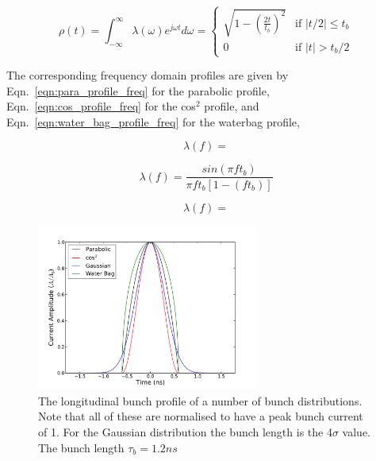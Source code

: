 \begin{equation}
\rho\left( t \right) = \int^{\infty}_{-\infty} \lambda \left( \omega \right) e^{j\omega t} d\omega = 
\begin{cases}
\sqrt{1-\left( \frac{2t}{t_{b}}\right)^{2}} &\textrm{if $| t/2 | \leq t_{b}$}\\
0								&\textrm{if $| t | > t_{b}/2$}
\end{cases}
\label{eqn:water_bag_profile}
\end{equation}

The corresponding frequency domain profiles are given by Eqn.~\ref{eqn:para_profile_freq} for the parabolic profile, Eqn.~\ref{eqn:cos_profile_freq} for the cos$^{2}$ profile, and Eqn.~\ref{eqn:water_bag_profile_freq} for the waterbag profile,

\begin{equation}
 \lambda \left( f \right) = 
\label{eqn:para_profile_freq}
\end{equation}

\begin{equation}
\lambda \left( f \right)  = \frac{sin \left( \pi f t_{b} \right)}{\pi f t_{b} \left[ 1 - \left( f t_{b} \right) \right]}
\label{eqn:cos_profile_freq}
\end{equation}

\begin{equation}
\lambda \left( f \right) = 
\label{eqn:water_bag_profile_freq}
\end{equation}

\begin{figure}
\begin{center}
\includegraphics[width=0.65\textwidth]{Wakefields_and_Impedances/figures/bunch_profile_12ns.pdf}
\end{center}
\label{fig:time_bunch_profiles}
\caption{The longitudinal bunch profile of a number of bunch distributions. Note that all of these are normalised to have a peak bunch current of 1. For the Gaussian distribution the bunch length is the 4$\sigma$ value. The bunch length $\tau_{b} = 1.2ns$}
\end{figure}

